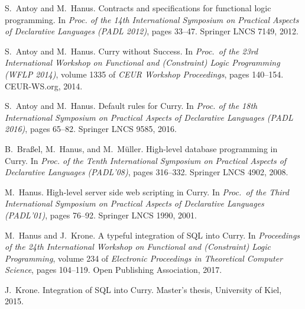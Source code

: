 \documentclass[11pt,fleqn]{article}
\begin{document}
\sloppy

\newcommand{\curryppdocs}{.}

\clearpage
\appendix


\begin{thebibliography}{10}

S.~Antoy and M.~Hanus.
\newblock Contracts and specifications for functional logic programming.
\newblock In {\em Proc. of the 14th International Symposium on Practical
  Aspects of Declarative Languages (PADL 2012)}, pages 33--47. Springer LNCS
  7149, 2012.

S.~Antoy and M.~Hanus.
\newblock Curry without {Success}.
\newblock In {\em Proc.\ of the 23rd International Workshop on Functional and
  (Constraint) Logic Programming (WFLP 2014)}, volume 1335 of {\em {CEUR}
  Workshop Proceedings}, pages 140--154. CEUR-WS.org, 2014.

S.~Antoy and M.~Hanus.
\newblock Default rules for {Curry}.
\newblock In {\em Proc. of the 18th International Symposium on Practical
  Aspects of Declarative Languages (PADL 2016)}, pages 65--82. Springer LNCS
  9585, 2016.

B.~Bra{\ss}el, M.~Hanus, and M.~M{\"u}ller.
\newblock High-level database programming in {Curry}.
\newblock In {\em Proc. of the Tenth International Symposium on Practical
  Aspects of Declarative Languages (PADL'08)}, pages 316--332. Springer LNCS
  4902, 2008.

M.~Hanus.
\newblock High-level server side web scripting in {C}urry.
\newblock In {\em Proc.\ of the Third International Symposium on Practical
  Aspects of Declarative Languages (PADL'01)}, pages 76--92. Springer LNCS
  1990, 2001.

M.~Hanus and J.~Krone.
\newblock A typeful integration of {SQL} into {Curry}.
\newblock In {\em Proceedings of the 24th International Workshop on Functional
  and (Constraint) Logic Programming}, volume 234 of {\em Electronic
  Proceedings in Theoretical Computer Science}, pages 104--119. Open Publishing
  Association, 2017.

J.~Krone.
\newblock Integration of {SQL} into {Curry}.
\newblock Master's thesis, University of Kiel, 2015.

\end{thebibliography}
\end{document}
